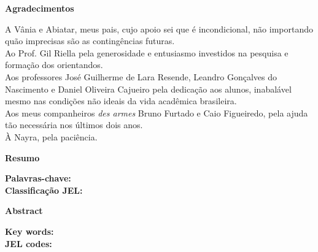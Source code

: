\documentclass[11pt, a4paper]{article}
\theoremstyle{nonumberplain}
\theoremstyle{plain}
\theoremstyle{plain}
\theoremstyle{plain}
\theoremstyle{nonumberplain}
\begin{document}
\begin{titlepage}
\begin{center}
\textbf{\Large Agradecimentos}
\end{center}
\vspace{1.5cm}
A Vânia e Abiatar, meus pais, cujo apoio sei que é incondicional, não importando quão imprecisas são as contingências futuras. \\

\noindent
Ao Prof. Gil Riella pela generosidade e entusiasmo investidos na pesquisa e formação dos orientandos.\\ 

\noindent
Aos professores José Guilherme de Lara Resende, Leandro Gonçalves do Nascimento  e Daniel Oliveira Cajueiro pela dedicação aos alunos, inabalável mesmo nas condições não ideais da vida acadêmica brasileira.\\

\noindent
Aos meus companheiros \emph{des armes} Bruno Furtado e Caio Figueiredo, pela ajuda tão necessária nos últimos dois anos.\\ 

\noindent
À Nayra, pela paciência.     

 
\end{titlepage}

\begin{titlepage}
\begin{center}
\textbf{\Large Resumo}
\end{center}
\vspace{1.5cm}

\begin{flushleft}
\textbf{Palavras-chave:}\\
\textbf{Classificação JEL:}
\end{flushleft}
\end{titlepage}

\begin{titlepage}
\begin{center}
\textbf{\Large Abstract}
\end{center}
\vspace{1.5cm}
\begin{flushleft}
\textbf{Key words:}\\
\textbf{JEL codes:}
\end{flushleft}
\end{titlepage}

\clearpage
\tableofcontents
\clearpage
\end{document}

